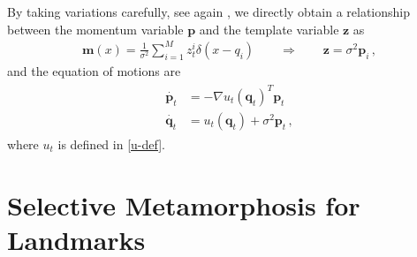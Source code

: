 \documentclass[runningheads]{llncs}
\begin{document}
By taking variations carefully, see again \cite{holm2009euler}, we directly obtain a relationship
between the momentum variable $\mathbf p$ and the template variable $\mathbf z$ as
\begin{align}
  \mathbf m(x) = \frac{1}{\sigma^2} \sum_{i=1}^M z_t^i\delta(x-q_i)\qquad \Rightarrow \qquad
  \mathbf z = \sigma^2 \mathbf p_i\, , 
\end{align}
and the equation of motions are
\begin{align}
  \begin{split}
  \dot{\mathbf p_t} &= - \nabla u_t(\mathbf q_t)^T \mathbf p_t\\ 
  \dot{\mathbf q_t} &= u_t(\mathbf q_t) +  \sigma^2\mathbf p_t \,,
  \end{split}
  \label{eq-m-classic}
\end{align}
where $u_t$ is defined in \eqref{u-def}. 


\section{Selective Metamorphosis for Landmarks}\label{sec:select_mm}
\end{document}
